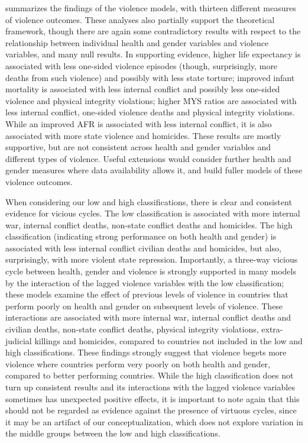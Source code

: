 \documentclass[12pt]{article}
\begin{document}
 summarizes the findings of the violence models, with thirteen different measures of violence outcomes.
These analyses also partially support the theoretical framework, though there are again some contradictory results with respect to the relationship between individual health and gender variables and violence variables, and many null results.
In supporting evidence, higher life expectancy is associated with less one-sided violence episodes (though, surprisingly, more deaths from such violence) and possibly with less state torture; improved infant mortality is associated with less internal conflict and possibly less one-sided violence and physical integrity violations; higher MYS ratios are associated with less internal conflict, one-sided violence deaths and physical integrity violations.
While an improved AFR is associated with less internal conflict, it is also associated with more state violence and homicides.
These results are mostly supportive, but are not consistent across health and gender variables and different types of violence.
Useful extensions would consider further health and gender measures where data availability allows it, and build fuller models of these violence outcomes.

When considering our low and high classifications, there is clear and consistent evidence for vicious cycles.
The low classification is associated with more internal war, internal conflict deaths, non-state conflict deaths and homicides.
The high classification (indicating strong performance on both health and gender) is associated with less internal conflict civilian deaths and homicides, but also, surprisingly, with more violent state repression.
Importantly, a three-way vicious cycle between health, gender and violence is strongly supported in many models by the interaction of the lagged violence variables with the low classification; these models examine the effect of previous levels of violence in countries that perform poorly on health and gender on subsequent levels of violence.
These interactions are associated with more internal war, internal conflict deaths and civilian deaths, non-state conflict deaths, physical integrity violations, extra-judicial killings and homicides, compared to countries not included in the low and high classifications.
These findings strongly suggest that violence begets more violence where countries perform very poorly on both health and gender, compared to better performing countries.
While the high classification does not turn up consistent results and its interactions with the lagged violence variables sometimes has unexpected positive effects, it is important to note again that this should not be regarded as evidence against the presence of virtuous cycles, since it may be an artifact of our conceptualization, which does not explore variation in the middle groups between the low and high classifications.
\end{document}
